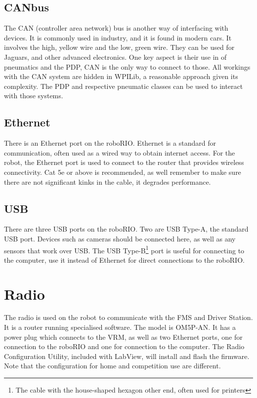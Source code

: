 \documentclass[]{report}
\begin{document}
\subsection{CANbus}
The CAN (controller area network) bus is another way of interfacing with devices.
It is commonly used in industry, and it is found in modern cars.
It involves the high, yellow wire and the low, green wire.
They can be used for Jaguars, and other advanced electronics.
One key aspect is their use in of pneumatics and the PDP,  CAN is the only way to connect to those.
All workings with the CAN system are hidden in WPILib, a reasonable approach given its complexity.
The PDP and respective pneumatic classes can be used to interact with those systems.

\subsection{Ethernet}
There is an Ethernet port on the roboRIO.
Ethernet is a standard for communication, often used as a wired way to obtain internet access.
For the robot, the Ethernet port is used to connect to the router that provides wireless connectivity.
Cat 5e or above is recommended, as well remember to make sure there are not significant kinks in the cable, it degrades performance.

\subsection{USB}
	There are three USB ports on the roboRIO.
	Two are USB Type-A, the standard USB port.
	Devices such as cameras should be connected here, as well as any sensors that work over USB.
	\newline
	The USB Type-B\footnote{The cable with the house-shaped hexagon other end, often used for printers} port is useful for connecting to the computer, use it instead of Ethernet for direct connections to the roboRIO.

\section{Radio}
	The radio is used on the robot to communicate with the FMS and Driver Station. It is a router running specialised software.
	The model is OM5P-AN.
	It has a power plug which connects to the VRM, as well as two Ethernet ports, one for connection to the roboRIO and one for connection to the computer.
	 The Radio Configuration Utility, included with LabView, will install and flash the firmware.
	 Note that the configuration for home and competition use are different.
\end{document}
